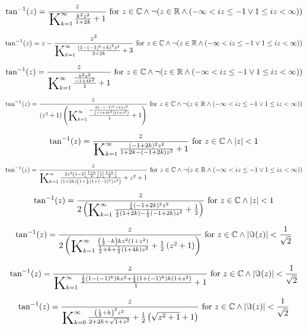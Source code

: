 \documentclass{article}
\newcommand{\bigK}{\mathop{\raisebox{-5pt}{\huge K}}}
\begin{document}
\[\tan ^{-1}(z)=\frac{z}{\bigK_{k=1}^{\infty}\frac{k^2 z^2}{1+2 k}+1}\text{ for }z\in \mathbb{C}\land \neg (z\in \mathbb{R}\land (-\infty <i z\leq -1\lor 1\leq i z<\infty ))\] 

\[\tan ^{-1}(z)=z-\frac{z^3}{\bigK_{k=1}^{\infty}\frac{\left(1-(-1)^k+k\right)^2 z^2}{3+2 k}+3}\text{ for }z\in \mathbb{C}\land \neg (z\in \mathbb{R}\land (-\infty <i z\leq -1\lor 1\leq i z<\infty ))\] 

\[\tan ^{-1}(z)=\frac{z}{\bigK_{k=1}^{\infty}\frac{\frac{k^2 z^2}{-1+4 k^2}}{1}+1}\text{ for }z\in \mathbb{C}\land \neg (z\in \mathbb{R}\land (-\infty <i z\leq -1\lor 1\leq i z<\infty ))\] 

\[\tan ^{-1}(z)=\frac{z}{\left(z^2+1\right) \left(\bigK_{k=1}^{\infty}\frac{-\frac{k \left(-(-1)^k+k\right) z^2}{\left(-1+4 k^2\right) \left(1+z^2\right)}}{1}+1\right)}\text{ for }z\in \mathbb{C}\land \neg (z\in \mathbb{R}\land (-\infty <i z\leq -1\lor 1\leq i z<\infty ))\] 

\[\tan ^{-1}(z)=\frac{z}{\bigK_{k=1}^{\infty}\frac{(-1+2 k)^2 z^2}{1+2 k-(-1+2 k) z^2}+1}\text{ for }z\in \mathbb{C}\land \left| z\right| <1\] 

\[\tan ^{-1}(z)=\frac{z}{\bigK_{k=1}^{\infty}\frac{2 z^2 \left(1-2 \left\lfloor \frac{1+k}{2}\right\rfloor \right) \left\lfloor \frac{1+k}{2}\right\rfloor }{(1+2 k) \left(1+\frac{1}{2} \left(1+(-1)^k\right) z^2\right)}+z^2+1}\text{ for }z\in \mathbb{C}\land \neg (z\in \mathbb{R}\land (-\infty <i z\leq -1\lor 1\leq i z<\infty ))\] 

\[\tan ^{-1}(z)=\frac{z}{2 \left(\bigK_{k=1}^{\infty}\frac{\frac{1}{4} (-1+2 k)^2 z^2}{\frac{1}{2} (1+2 k)-\frac{1}{2} (-1+2 k) z^2}+\frac{1}{2}\right)}\text{ for }z\in \mathbb{C}\land \left| z\right| <1\] 

\[\tan ^{-1}(z)=\frac{z}{2 \left(\bigK_{k=1}^{\infty}\frac{\left(\frac{1}{2}-k\right) k z^2 \left(1+z^2\right)}{\frac{1}{2}+k+\frac{1}{2} (1+4 k) z^2}+\frac{1}{2} \left(z^2+1\right)\right)}\text{ for }z\in \mathbb{C}\land \left| \Im(z)\right| <\frac{1}{\sqrt{2}}\] 

\[\tan ^{-1}(z)=\frac{z}{\bigK_{k=1}^{\infty}\frac{\frac{1}{2} \left(1-(-1)^k\right) k z^2+\frac{1}{2} \left(1+(-1)^k\right) k \left(1+z^2\right)}{1}+1}\text{ for }z\in \mathbb{C}\land \left| \Im(z)\right| <\frac{1}{\sqrt{2}}\] 

\[\tan ^{-1}(z)=\frac{z}{\bigK_{k=0}^{\infty}\frac{\left(\frac{1}{2}+k\right)^2 z^2}{2+2 k+\sqrt{1+z^2}}+\frac{1}{2} \left(\sqrt{z^2+1}+1\right)}\text{ for }z\in \mathbb{C}\land \left| \Im(z)\right| <\frac{1}{\sqrt{2}}\] 
\end{document}
